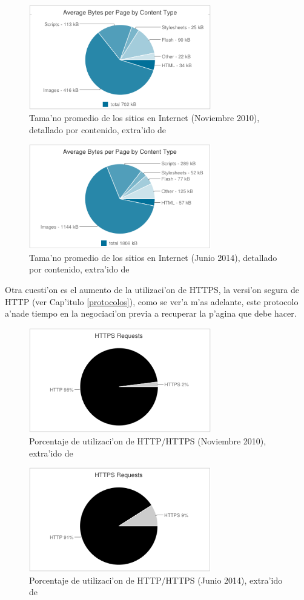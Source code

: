 \begin{figure}[h]
  	\centering
	\includegraphics[width=300px]{img/grafSitios2010}
	\caption{\small Tama'no promedio de los sitios en Internet (Noviembre 2010), detallado por contenido, extra'ido de \cite{httparchive}}
	\label{grafSitios2010}
\end{figure}

\begin{figure}[h]
  	\centering
	\includegraphics[width=300px]{img/grafSitios2014}
	\caption{\small Tama'no promedio de los sitios en Internet (Junio 2014), detallado por contenido, extra'ido de \cite{httparchive}}
	\label{grafSitios2014}
\end{figure}

Otra cuesti'on es el aumento de la utilizaci'on de HTTPS, la versi'on segura de HTTP (ver Cap'itulo \ref{protocolos}), como se ver'a m'as adelante, este protocolo a'nade tiempo en la negociaci'on previa a recuperar la p'agina que debe hacer.

\begin{figure}[h]
  	\centering
	\includegraphics[width=300px]{img/httphttps2010}
	\caption{\small Porcentaje de utilizaci'on de HTTP/HTTPS (Noviembre 2010), extra'ido de \cite{httparchive}}
	\label{httphttps2010}
\end{figure}

\begin{figure}[h]
  	\centering
	\includegraphics[width=300px]{img/httphttps2014}
	\caption{\small Porcentaje de utilizaci'on de HTTP/HTTPS (Junio 2014), extra'ido de \cite{httparchive}}
	\label{httphttps2014}
\end{figure}